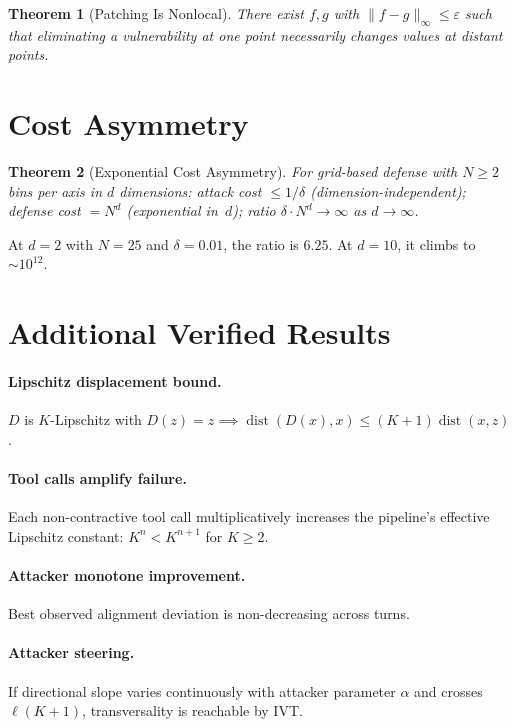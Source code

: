 \documentclass{article}
\newtheorem{theorem}{Theorem}[section]
\newcommand{\dist}{\operatorname{dist}}
\begin{document}
\begin{theorem}[Patching Is Nonlocal]
\label{thm:nonlocal}
There exist $f, g$ with $\|f-g\|_\infty \leq \varepsilon$ such that
eliminating a vulnerability at one point necessarily changes values at
distant points.
\end{theorem}


\section{Cost Asymmetry}
\label{app:cost}

\begin{theorem}[Exponential Cost Asymmetry]
\label{thm:cost}
For grid-based defense with $N \geq 2$ bins per axis in $d$ dimensions:
attack cost $\leq 1/\delta$ (dimension-independent); defense cost
$= N^d$ (exponential in~$d$); ratio
$\delta \cdot N^d \to \infty$ as $d\to\infty$.
\end{theorem}

At $d=2$ with $N=25$ and $\delta=0.01$, the ratio is $6.25$.
At $d=10$, it climbs to $\sim 10^{12}$.


\section{Additional Verified Results}
\label{app:additional}

\paragraph{Lipschitz displacement bound.}
$D$ is $K$-Lipschitz with $D(z) = z \implies
\dist(D(x), x) \leq (K+1)\dist(x,z)$.

\paragraph{Tool calls amplify failure.}
Each non-contractive tool call multiplicatively increases the pipeline's
effective Lipschitz constant: $K^n < K^{n+1}$ for $K \geq 2$.

\paragraph{Attacker monotone improvement.}
Best observed alignment deviation is non-decreasing across turns.

\paragraph{Attacker steering.}
If directional slope varies continuously with attacker parameter $\alpha$
and crosses $\ell(K+1)$, transversality is reachable by IVT.
\end{document}
